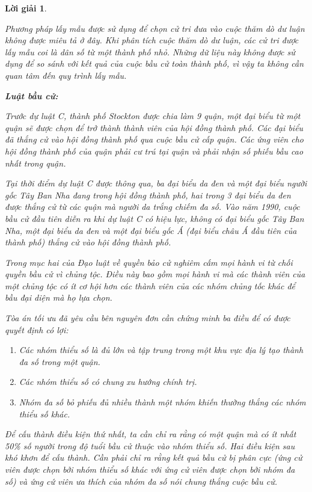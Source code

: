 \documentclass[14pt, a4paper]{article}
\theoremstyle{sltheorem}
\theoremstyle{soltheorem}
\newtheorem*{loigiai}{Lời giải}
\begin{document}
\begin{loigiai}
\begin{enumerate}
        Phương pháp lấy mẫu được sử dụng để chọn cử tri đưa vào cuộc thăm dò dư luận không được miêu tả ở đây.
        Khi phân tích cuộc thăm dò dư luận, các cử tri được lấy mẫu coi là dân số từ một thành phố nhỏ.
        Những dữ liệu này không được sử dụng để so sánh với kết quả của cuộc bầu cử toàn thành phố, vì vậy ta không cần quan tâm đến quy trình lấy mẫu.

        \textbf{Luật bầu cử:}

        Trước dự luật C, thành phố Stockton được chia làm 9 quận, một đại biểu từ một quận sẽ được chọn để trở thành thành viên của hội đồng thành phố.
        Các đại biểu đã thắng cử vào hội đồng thành phố qua cuộc bầu cử cấp quận.
        Các ứng viên cho hội đồng thành phố của quận phải cư trú tại quận và phải nhận số phiếu bầu cao nhất trong quận.

        Tại thời điểm dự luật C được thông qua, ba đại biểu da đen và một đại biểu người gốc Tây Ban Nha đang trong hội đồng thành phố,
        hai trong 3 đại biểu da đen được thắng cử từ các quận mà người da trắng chiếm đa số.
        Vào năm 1990, cuộc bầu cử đầu tiên diễn ra khi dự luật C có hiệu lực, không có đại biểu gốc Tây Ban Nha, một đại biểu da đen và một đại biểu gốc Á (đại biểu châu Á đầu tiên của thành phố) thắng cử vào hội đồng thành phố.

        Trong mục hai của Đạo luật về quyền bảo cử nghiêm cấm mọi hành vi từ chối quyền bầu cử vì chủng tộc.
        Điều này bao gồm mọi hành vi mà các thành viên của một chủng tộc có ít cơ hội hơn các thành viên của các nhóm chủng tốc khác để bầu đại diện mà họ lựa chọn.

        Tòa án tối ưu đã yêu cầu bên nguyên đơn cần chứng minh ba điều để có được quyết định có lợi:

        \begin{enumerate}
            \item Các nhóm thiểu số là đủ lớn và tập trung trong một khu vực địa lý tạo thành đa số trong một quận.
            \item Các nhóm thiểu số có chung xu hướng chính trị.
            \item Nhóm đa số bỏ phiếu đủ nhiều thành một nhóm khiến thường thắng các nhóm thiểu số khác.
        \end{enumerate}

        Để cấu thành điều kiện thứ nhất, ta cần chỉ ra rằng có một quận mà có ít nhất 50\% số người trong độ tuổi bầu cử thuộc vào nhóm thiểu số.
        Hai điều kiện sau khó khơn để cấu thành.
        Cần phải chỉ ra rằng kết quả bầu cử bị phân cực (ứng cử viên được chọn bởi nhóm thiểu số khác với ứng cử viên được chọn bởi nhóm đa số) và ứng cứ viên ưa thích của nhóm đa số nói chung thắng cuộc bầu cử.


\end{enumerate}
\end{loigiai}
\end{document}
